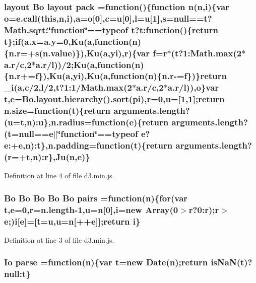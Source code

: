 \subsubsection[{pack}]{ {\bf layout} {\bf Bo} {\bf layout} pack =function()\{function {\bf n}({\bf n},{\bf i})\{var {\bf o}={\bf e.\+call}({\bf this},{\bf n},{\bf i}),{\bf a}={\bf o}[0],{\bf c}=u[0],l=u[1],s=null==t?Math.\+sqrt\+:\char`\"{}function\char`\"{}==typeof t?t\+:function()\{{\bf return} t\};{\bf if}({\bf a.\+x}=a.\+y=0,{\bf Ku}({\bf a},function({\bf n})\{{\bf n.\+r}=+s(n.\+value)\}),{\bf Ku}({\bf a},{\bf yi}),{\bf r})\{var {\bf f}={\bf r}$\ast$(t?1\+:{\bf Math.\+max}(2$\ast${\bf a.\+r}/{\bf c},2$\ast${\bf a.\+r}/l))/2;{\bf Ku}({\bf a},function({\bf n})\{{\bf n.\+r}+={\bf f}\}),{\bf Ku}({\bf a},{\bf yi}),{\bf Ku}({\bf a},function({\bf n})\{{\bf n.\+r}-\/={\bf f}\})\}{\bf return} {\bf \+\_\+i}({\bf a},{\bf c}/2,l/2,t?1\+:1/{\bf Math.\+max}(2$\ast${\bf a.\+r}/{\bf c},2$\ast${\bf a.\+r}/l)),{\bf o}\}var t,{\bf e}={\bf Bo.\+layout.\+hierarchy}().{\bf sort}({\bf pi}),{\bf r}=0,u=[1,1];{\bf return} {\bf n.\+size}=function(t)\{{\bf return} arguments.\+length?(u=t,{\bf n})\+:u\},n.\+radius=function({\bf e})\{{\bf return} arguments.\+length?(t=null=={\bf e}$\vert$$\vert$\char`\"{}function\char`\"{}==typeof {\bf e}?e\+:+{\bf e},{\bf n})\+:t\},n.\+padding=function(t)\{{\bf return} arguments.\+length?({\bf r}=+t,{\bf n})\+:{\bf r}\},{\bf Ju}({\bf n},{\bf e})\}}\label{d3_8min_8js_afd12e74117bbc74985b7d2360aad847c}


Definition at line 4 of file d3.\+min.\+js.

\subsubsection[{pairs}]{ {\bf Bo} {\bf Bo} {\bf Bo} {\bf Bo} {\bf Bo} pairs =function({\bf n})\{{\bf for}(var t,{\bf e}=0,{\bf r}=n.\+length-\/1,u={\bf n}[0],{\bf i}=new Array(0$>${\bf r}?0\+:{\bf r});{\bf r}$>${\bf e};){\bf i}[{\bf e}]=[t=u,u={\bf n}[++{\bf e}]];{\bf return} {\bf i}\}}\label{d3_8min_8js_a8870aaf58d999724b65fb03d61446f19}


Definition at line 3 of file d3.\+min.\+js.

\subsubsection[{parse}]{ {\bf Io} parse =function({\bf n})\{var t=new Date({\bf n});{\bf return} is\+Na\+N(t)?null\+:t\}}\label{d3_8min_8js_ae83605c3912b7dd2017d8889154727ad}


